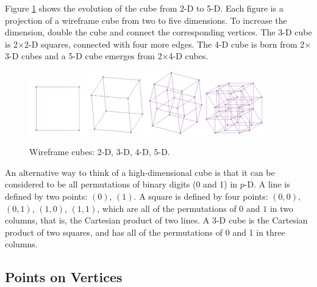 \documentclass[article]{jss}
\begin{document}
Figure \ref{boxes} shows the evolution of the cube from 2-D to
5-D. Each figure is a projection of a wireframe cube from two to five
dimensions. To increase the dimension, double the cube and connect the
corresponding vertices. The 3-D cube is 2$\times$2-D squares,
connected with four more edges. The 4-D cube is born from 2$\times$3-D
cubes and a 5-D cube emerges from 2$\times$4-D cubes.

\begin{figure}[ht]
\centerline{\includegraphics[width=1in]{cube2D.pdf}\includegraphics[width=1in]{cube3D.pdf}\includegraphics[width=1in]{cube4D.pdf}\includegraphics[width=1in]{cube5D.pdf}}
\caption{Wireframe cubes: 2-D, 3-D, 4-D, 5-D.}
\label{boxes}
\end{figure}

An alternative way to think of a high-dimensional cube is that it can
be considered to be all permutations of binary digits (0 and 1) in
$p$-D. A line is defined by two points: $(0)$, $(1)$. A square is
defined by four points: $(0,0)$, $(0,1)$, $(1,0)$, $(1,1)$, which are
all of the permutations of $0$ and $1$ in two columns, that is, the
Cartesian product of two lines. A 3-D cube is the Cartesian product of
two squares, and has all of the permutations of 0 and 1 in three
columns.

\subsection{Points on Vertices}~\label{cube-vertices}
\end{document}
